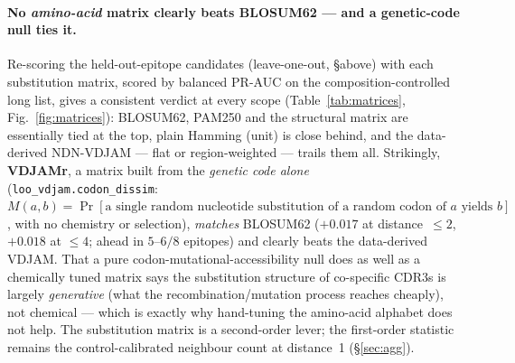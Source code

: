 \documentclass[11pt]{article}
\theoremstyle{oldplain}
\theoremstyle{oldrem}
\begin{document}
\paragraph{No \emph{amino-acid} matrix clearly beats BLOSUM62 --- and a genetic-code null ties it.}
Re-scoring the held-out-epitope candidates (leave-one-out, \S above) with each substitution matrix,
scored by balanced PR-AUC on the composition-controlled long list, gives a consistent verdict at every
scope (Table~\ref{tab:matrices}, Fig.~\ref{fig:matrices}): BLOSUM62, PAM250 and the structural matrix
are essentially tied at the top, plain Hamming (unit) is close behind, and the data-derived NDN-VDJAM
--- flat or region-weighted --- trails them all. Strikingly, \textbf{VDJAMr}, a matrix built from the
\emph{genetic code alone} (\texttt{loo\_vdjam.codon\_dissim}: $M(a,b)=\Pr[\text{a single random
nucleotide substitution of a random codon of }a\text{ yields }b]$, with no chemistry or selection),
\emph{matches} BLOSUM62 ($+0.017$ at distance~$\le2$, $+0.018$ at $\le4$; ahead in $5$--$6/8$ epitopes)
and clearly beats the data-derived VDJAM. That a pure codon-mutational-accessibility null does as well
as a chemically tuned matrix says the substitution structure of co-specific CDR3s is largely
\emph{generative} (what the recombination/mutation process reaches cheaply), not chemical --- which is
exactly why hand-tuning the amino-acid alphabet does not help. The substitution matrix is a
second-order lever; the first-order statistic remains the control-calibrated neighbour count at
distance~1 (\S\ref{sec:agg}).
\end{document}

